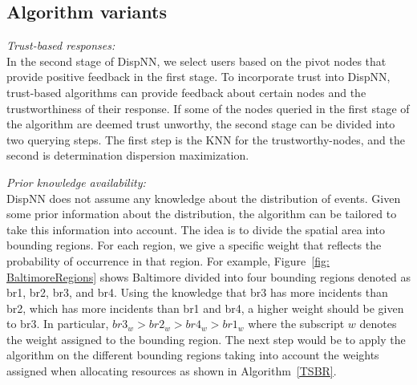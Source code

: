 \documentclass{acm_proc_article-sp}
\begin{document}
\subsection{Algorithm variants}
\textit{Trust-based responses:}\\
In the second stage of DispNN, we select users based on the pivot nodes that provide positive feedback in the first stage. To incorporate trust into DispNN, trust-based algorithms can provide feedback about certain nodes and the trustworthiness of their response. If some of the nodes queried in the first stage of the algorithm are deemed trust unworthy, the second stage can be divided into two querying steps. The first step is the KNN for the trustworthy-nodes, and the second is determination dispersion maximization. \par

\textit{Prior knowledge availability:}\\
DispNN does not assume any knowledge about the distribution of events. Given some prior information about the distribution, the algorithm can be tailored to take this information into account. The idea is to divide the spatial area into bounding regions. For each region, we give a specific weight that reflects the probability of occurrence in that region.
For example, Figure~\ref{fig: BaltimoreRegions} shows Baltimore divided into four bounding regions denoted as br1, br2, br3, and br4. Using the knowledge that br3 has more incidents than br2, which has more incidents than br1 and br4, a higher weight should be given to br3. In particular, $br3_w > br2_w> br4_w> br1_w$ where the subscript $w$ denotes the weight assigned to the bounding region. The next step would be to apply the algorithm on the different bounding regions taking into account the weights assigned when allocating resources as shown in Algorithm~\ref{TSBR}.
\end{document}
